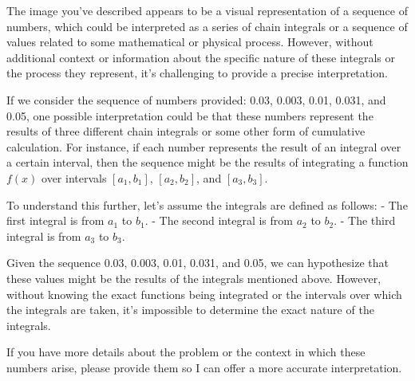 The image you've described appears to be a visual representation of a sequence of numbers, which could be interpreted as a series of chain integrals or a sequence of values related to some mathematical or physical process. However, without additional context or information about the specific nature of these integrals or the process they represent, it's challenging to provide a precise interpretation.

If we consider the sequence of numbers provided: 0.03, 0.003, 0.01, 0.031, and 0.05, one possible interpretation could be that these numbers represent the results of three different chain integrals or some other form of cumulative calculation. For instance, if each number represents the result of an integral over a certain interval, then the sequence might be the results of integrating a function \( f(x) \) over intervals \( [a_1, b_1] \), \( [a_2, b_2] \), and \( [a_3, b_3] \).

To understand this further, let's assume the integrals are defined as follows:
- The first integral is from \( a_1 \) to \( b_1 \).
- The second integral is from \( a_2 \) to \( b_2 \).
- The third integral is from \( a_3 \) to \( b_3 \).

Given the sequence 0.03, 0.003, 0.01, 0.031, and 0.05, we can hypothesize that these values might be the results of the integrals mentioned above. However, without knowing the exact functions being integrated or the intervals over which the integrals are taken, it's impossible to determine the exact nature of the integrals.

If you have more details about the problem or the context in which these numbers arise, please provide them so I can offer a more accurate interpretation.